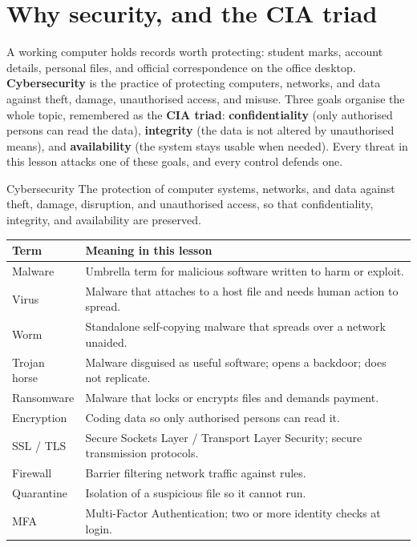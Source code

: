 \section{Why security, and the CIA triad}
A working computer holds records worth protecting: student marks, account
details, personal files, and official correspondence on the office desktop.
\textbf{Cybersecurity} is the practice of protecting computers, networks,
and data against theft, damage, unauthorised access, and misuse. Three
goals organise the whole topic, remembered as the \textbf{CIA triad}:
\textbf{confidentiality} (only authorised persons can read the data),
\textbf{integrity} (the data is not altered by unauthorised means), and
\textbf{availability} (the system stays usable when needed). Every threat
in this lesson attacks one of these goals, and every control defends one.

\begin{definitionbox}{Cybersecurity}
The protection of computer systems, networks, and data against theft,
damage, disruption, and unauthorised access, so that confidentiality,
integrity, and availability are preserved.
\end{definitionbox}

\begin{center}
\begin{tabular}{p{}p{}}
\toprule
\textbf{Term} & \textbf{Meaning in this lesson} \\
\midrule
Malware & Umbrella term for malicious software written to harm or exploit. \\
Virus & Malware that attaches to a host file and needs human action to spread. \\
Worm & Standalone self-copying malware that spreads over a network unaided. \\
Trojan horse & Malware disguised as useful software; opens a backdoor; does not replicate. \\
Ransomware & Malware that locks or encrypts files and demands payment. \\
Encryption & Coding data so only authorised persons can read it. \\
SSL / TLS & Secure Sockets Layer / Transport Layer Security; secure transmission protocols. \\
Firewall & Barrier filtering network traffic against rules. \\
Quarantine & Isolation of a suspicious file so it cannot run. \\
MFA & Multi-Factor Authentication; two or more identity checks at login. \\
\bottomrule
\end{tabular}
\end{center}

